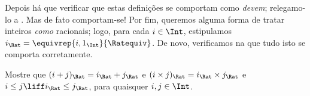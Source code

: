 \documentclass[../../../include/open-logic-section]{subfiles}
\begin{document}
Depois há que verificar que estas definições se comportam como \emph{devem};
relegamo-lo a . Mas de fato comportam-se!{} Por fim,
queremos alguma forma de tratar inteiros \emph{como} racionais; logo, para cada
$i \in \Int$, estipulamos $i_\Rat =
\equivrep{i, 1_\Int}{\Ratequiv}$. De novo, verificamos na  que
tudo isto se comporta corretamente.

\begin{prob}
Mostre que $(i + j)_\Rat = i_\Rat + j_\Rat$ e $(i \times j)_\Rat =
i_\Rat \times j_\Rat$ e $i \leq j \liff i_\Rat \leq j_\Rat$, para quaisquer
$i, j \in \Int$.
\end{prob}
\end{document}
